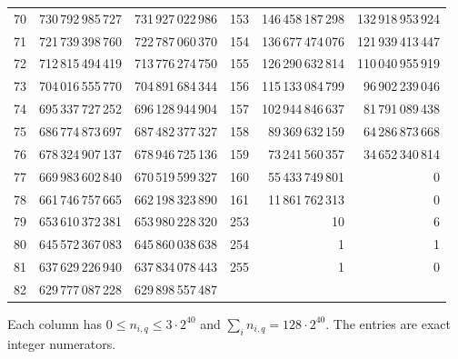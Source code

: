 \begin{longtable}{@{}r r r@{\qquad\qquad}r r r@{}}
70 & 730\,792\,985\,727 & 731\,927\,022\,986 & 153 & 146\,458\,187\,298 & 132\,918\,953\,924\\
71 & 721\,739\,398\,760 & 722\,787\,060\,370 & 154 & 136\,677\,474\,076 & 121\,939\,413\,447\\
72 & 712\,815\,494\,419 & 713\,776\,274\,750 & 155 & 126\,290\,632\,814 & 110\,040\,955\,919\\
73 & 704\,016\,555\,770 & 704\,891\,684\,344 & 156 & 115\,133\,084\,799 & 96\,902\,239\,046\\
74 & 695\,337\,727\,252 & 696\,128\,944\,904 & 157 & 102\,944\,846\,637 & 81\,791\,089\,438\\
75 & 686\,774\,873\,697 & 687\,482\,377\,327 & 158 & 89\,369\,632\,159 & 64\,286\,873\,668\\
76 & 678\,324\,907\,137 & 678\,946\,725\,136 & 159 & 73\,241\,560\,357 & 34\,652\,340\,814\\
77 & 669\,983\,602\,840 & 670\,519\,599\,327 & 160 & 55\,433\,749\,801 & 0\\
78 & 661\,746\,757\,665 & 662\,198\,323\,890 & 161 & 11\,861\,762\,313 & 0\\
79 & 653\,610\,372\,381 & 653\,980\,228\,320 & 253 & 10 & 6\\
80 & 645\,572\,367\,083 & 645\,860\,038\,638 & 254 & 1 & 1\\
81 & 637\,629\,226\,940 & 637\,834\,078\,443 & 255 & 1 & 0\\
82 & 629\,777\,087\,228 & 629\,898\,557\,487 &  &  & \\
\bottomrule
\end{longtable}
\normalsize
\noindent Each column has $0\le n_{i,q}\le3\cdot2^{40}$ and $\sum_i n_{i,q}=128\cdot2^{40}$. The entries are exact integer numerators.
